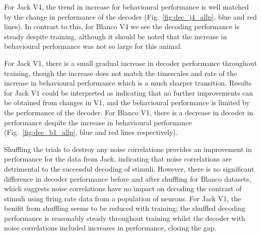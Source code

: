 


For Jack V4, the trend in increase for behavioural performance is well matched by the change in performance of the decoder (Fig.~\ref{fig:dec_j4_allp}, blue and red lines). In contrast to this, for Blanco V4 we see the decoding performance is steady despite training, although it should be noted that the increase in behavioural performance was not so large for this animal.

For Jack V1, there is a small gradual increase in decoder performance throughout training, though the increase does not match the timescales and rate of the increase in behavioural performance which is a much sharper transition. Results for Jack V1 could be interpreted as indicating that no further improvements can be obtained from changes in V1, and the behavioural performance is limited by the performance of the decoder.
For Blanco V1, there is a decrease in decoder in performance despite the increase in behavioural performance (Fig.~\ref{fig:dec_b1_allp}, blue and red lines respectively). 

Shuffling the trials to destroy any noise correlations provides an improvement in performance for the data from Jack, indicating that noise correlations are detrimental to the successful decoding of stimuli. However, there is no significant difference in decoder performance before and after shuffling for Blanco datasets, which suggests noise correlations have no impact on decoding the contrast of stimuli using firing rate data from a population of neurons.
For Jack V1, the benifit from shuffling seems to be reduced with training; the shuffled decoding performance is reasonably steady throughout training whilst the decoder with noise correlations included increases in performance, closing the gap.

